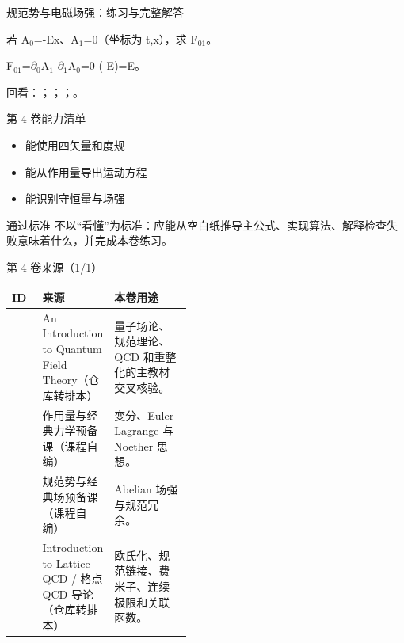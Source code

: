 \begin{frame}[t]{规范势与电磁场强：练习与完整解答}
\footnotesize
\begin{block}{}若 A\ensuremath{_{0}}=-Ex、A\ensuremath{_{1}}=0（坐标为 t,x），求 F\ensuremath{_{01}}。\end{block}
\begin{exampleblock}{}F\ensuremath{_{01}}=\ensuremath{\partial}\ensuremath{_{0}}A\ensuremath{_{1}}-\ensuremath{\partial}\ensuremath{_{1}}A\ensuremath{_{0}}=0-(-E)=E。\end{exampleblock}
\vfill
\scriptsize 回看：；；；。
\end{frame}

\begin{frame}[t]{第 4 卷能力清单}
\small\begin{itemize}
\item[\CheckMark] 能使用四矢量和度规
\item[\CheckMark] 能从作用量导出运动方程
\item[\CheckMark] 能识别守恒量与场强
\end{itemize}\vfill\begin{block}{通过标准}
不以“看懂”为标准：应能从空白纸推导主公式、实现算法、解释检查失败意味着什么，并完成本卷练习。
\end{block}\end{frame}

\begin{frame}[t]{第 4 卷来源（1/1）}
\scriptsize\begin{tabularx}{\linewidth}{p{0.17\linewidth}p{0.28\linewidth}Y}
\toprule ID & 来源 & 本卷用途\\\midrule
{} & An Introduction to Quantum Field Theory（仓库转排本） & 量子场论、规范理论、QCD 和重整化的主教材交叉核验。\\
 & 作用量与经典力学预备课（课程自编） & 变分、Euler--Lagrange 与 Noether 思想。\\
 & 规范势与经典场预备课（课程自编） & Abelian 场强与规范冗余。\\
 & Introduction to Lattice QCD /\allowbreak{} 格点 QCD 导论（仓库转排本） & 欧氏化、规范链接、费米子、连续极限和关联函数。\\
\bottomrule\end{tabularx}\end{frame}

